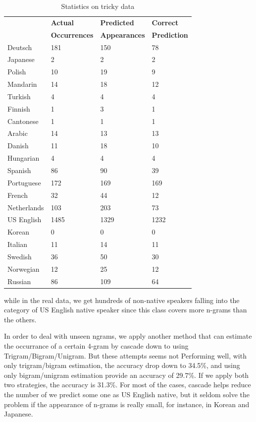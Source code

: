 \documentclass[11pt]{article}
\begin{document}
\begin{table}[h]
\begin{center}
\small\addtolength{\tabcolsep}{-5pt}
\begin{tabular}{|l|l|l|l|}
\hline & \bf Actual & \bf Predicted & \bf Correct \\ 
& \bf Occurrences & \bf Appearances & \bf Prediction \\ \hline
Deutsch & 181 & 150 & 78 \\
Japanese & 2 & 2 & 2 \\
Polish & 10 & 19 & 9 \\
Mandarin & 14 & 18 & 12 \\
Turkish & 4 & 4 & 4 \\
Finnish & 1 & 3 & 1 \\
Cantonese & 1 & 1 & 1 \\
Arabic & 14 & 13 & 13 \\
Danish & 11 & 18 & 10 \\
Hungarian & 4 & 4 & 4 \\
Spanish & 86 & 90 & 39 \\
Portuguese & 172 & 169 & 169 \\
French & 32 & 44 & 12 \\
Netherlands & 103 & 203 & 73 \\
US English & 1485 & 1329 & 1232 \\
Korean & 0 & 0 & 0 \\
Italian & 11 & 14 & 11\\
Swedish & 36 & 50 & 30 \\
Norwegian & 12 & 25 & 12 \\
Russian & 86 & 109 & 64 \\
\hline
\end{tabular}
\end{center}
\caption{\label{font-table} Statistics on tricky data }
\end{table}


while in the real data, we get hundreds of non-native speakers falling into the category of US English native speaker since this class covers more n-grams than the others.

In order to deal with unseen ngrams, we apply another method that can estimate the occurrance of a certain 4-gram by cascade down to using Trigram/Bigram/Unigram. But these attempts seems not Performing well, with only trigram/bigram estimation, the accuracy drop down to 34.5\%, and using only bigram/unigram estimation provide an accuracy of 29.7\%. If we apply both two strategies, the accuracy is 31.3\%. For most of the cases, cascade helps reduce the number of we predict some one as US English native, but it seldom solve the problem if the appearance of n-grams is really small, for instance, in Korean and Japanese.  
\end{document}
